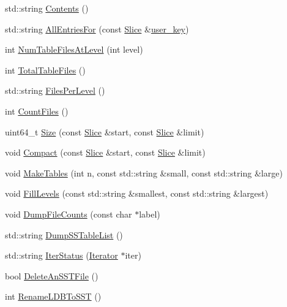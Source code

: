 \begin{DoxyCompactItemize}
\item 
std\+::string \mbox{\hyperlink{classleveldb_1_1_d_b_test_a3cf871664bd22c6ed2d6c2a8834b49fc}{Contents}} ()
\item 
std\+::string \mbox{\hyperlink{classleveldb_1_1_d_b_test_adaf171601eaaf2cd24edaa394752f733}{All\+Entries\+For}} (const \mbox{\hyperlink{classleveldb_1_1_slice}{Slice}} \&\mbox{\hyperlink{version__set_8cc_afced2118ae0bf03db7c7e75a21cfd004}{user\+\_\+key}})
\item 
int \mbox{\hyperlink{classleveldb_1_1_d_b_test_aa7c845810f6d57b0655eda370e8de33f}{Num\+Table\+Files\+At\+Level}} (int level)
\item 
int \mbox{\hyperlink{classleveldb_1_1_d_b_test_a05fa745351a41ecc0165b391a605b79e}{Total\+Table\+Files}} ()
\item 
std\+::string \mbox{\hyperlink{classleveldb_1_1_d_b_test_a0e4d6292bcbe450d34b558d48a51a331}{Files\+Per\+Level}} ()
\item 
int \mbox{\hyperlink{classleveldb_1_1_d_b_test_a0c6c0c1d470a50fdcb6cdbc54977e907}{Count\+Files}} ()
\item 
uint64\+\_\+t \mbox{\hyperlink{classleveldb_1_1_d_b_test_a2b16106ccbd302127b5c0575e74e6be1}{Size}} (const \mbox{\hyperlink{classleveldb_1_1_slice}{Slice}} \&start, const \mbox{\hyperlink{classleveldb_1_1_slice}{Slice}} \&limit)
\item 
void \mbox{\hyperlink{classleveldb_1_1_d_b_test_a9b6cd10fd7c8fc54127b0c40c0ac7db5}{Compact}} (const \mbox{\hyperlink{classleveldb_1_1_slice}{Slice}} \&start, const \mbox{\hyperlink{classleveldb_1_1_slice}{Slice}} \&limit)
\item 
void \mbox{\hyperlink{classleveldb_1_1_d_b_test_ace931478fa5ad2c48a8aa95a344e19fd}{Make\+Tables}} (int n, const std\+::string \&small, const std\+::string \&large)
\item 
void \mbox{\hyperlink{classleveldb_1_1_d_b_test_ac291d06db907f5fee7caf04f44f65493}{Fill\+Levels}} (const std\+::string \&smallest, const std\+::string \&largest)
\item 
void \mbox{\hyperlink{classleveldb_1_1_d_b_test_ad045c5203b4ea785ab335ffc3ea833b3}{Dump\+File\+Counts}} (const char $\ast$label)
\item 
std\+::string \mbox{\hyperlink{classleveldb_1_1_d_b_test_afdfc077be555dea7eac220623f6d4deb}{Dump\+S\+S\+Table\+List}} ()
\item 
std\+::string \mbox{\hyperlink{classleveldb_1_1_d_b_test_ad162fa0f5a31e61ee94ba9f45af716f8}{Iter\+Status}} (\mbox{\hyperlink{classleveldb_1_1_iterator}{Iterator}} $\ast$iter)
\item 
bool \mbox{\hyperlink{classleveldb_1_1_d_b_test_abcb2ebeb0733670d7634079c587426d2}{Delete\+An\+S\+S\+T\+File}} ()
\item 
int \mbox{\hyperlink{classleveldb_1_1_d_b_test_a104ae4b9292787d0cfc9a9fb93cc5fa8}{Rename\+L\+D\+B\+To\+S\+ST}} ()
\end{DoxyCompactItemize}
